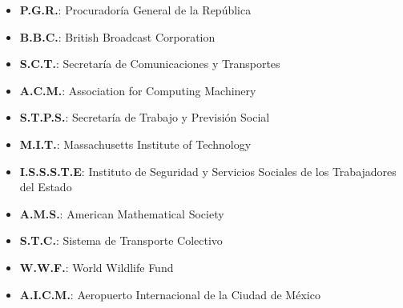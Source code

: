 \documentclass[a4paper,12pt]{article}
\begin{document}
\begin{itemize}
\begin{itemize}
\item \textbf{P.G.R.}: Procuradoría General de la República
\item \textbf{B.B.C.}: British Broadcast Corporation
\item \textbf{S.C.T.}: Secretaría de Comunicaciones y Transportes 
\item \textbf{A.C.M.}: Association for Computing Machinery
\item \textbf{S.T.P.S.}: Secretaría de Trabajo y Previsión Social 
\item \textbf{M.I.T.}: Massachusetts Institute of Technology
 \item \textbf{I.S.S.S.T.E}: Instituto de Seguridad y Servicios Sociales de los Trabajadores del Estado
 \item \textbf{A.M.S.}: American Mathematical Society	 
 \item \textbf{S.T.C.}: Sistema de Transporte Colectivo
 \item \textbf{W.W.F.}: World Wildlife Fund 
 \item \textbf{A.I.C.M.}: Aeropuerto Internacional de la Ciudad de México  
\end{itemize}
\end{itemize}
\end{document}
